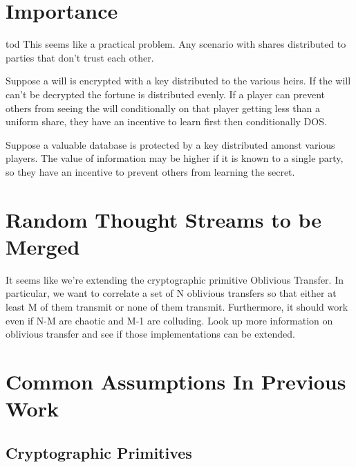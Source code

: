 \documentclass{article}
\begin{document}
\section{Importance}
tod This seems like a practical problem. Any scenario with shares distributed to parties that don't trust each other.

Suppose a will is encrypted with a key distributed to the various heirs. If the will can't be decrypted the fortune is distributed evenly. If a player can prevent others from seeing the will conditionally on that player getting less than a uniform share, they have an incentive to learn first then conditionally DOS.

Suppose a valuable database is protected by a key distributed amonst various players. The value of information may be higher if it is known to a single party, so they have an incentive to prevent others from learning the secret.

\section{Random Thought Streams to be Merged}
It seems like we're extending the cryptographic primitive Oblivious Transfer. In particular, we want to correlate a set of N oblivious transfers so that either at least M of them transmit or none of them transmit. Furthermore, it should work even if N-M are chaotic and M-1 are colluding. Look up more information on oblivious transfer and see if those implementations can be extended.

\section{Common Assumptions In Previous Work}
\subsection{Cryptographic Primitives}
\end{document}
